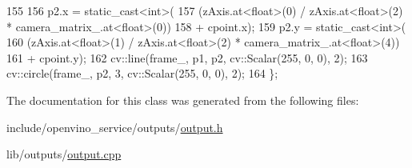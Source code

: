 \begin{DoxyCode}
155 
156   p2.x = \textcolor{keyword}{static\_cast<}\textcolor{keywordtype}{int}\textcolor{keyword}{>}(
157       (zAxis.at<\textcolor{keywordtype}{float}>(0) / zAxis.at<\textcolor{keywordtype}{float}>(2) * camera\_matrix\_.at<\textcolor{keywordtype}{float}>(0))
158           + cpoint.x);
159   p2.y = \textcolor{keyword}{static\_cast<}\textcolor{keywordtype}{int}\textcolor{keyword}{>}(
160       (zAxis.at<\textcolor{keywordtype}{float}>(1) / zAxis.at<\textcolor{keywordtype}{float}>(2) * camera\_matrix\_.at<\textcolor{keywordtype}{float}>(4))
161           + cpoint.y);
162   cv::line(frame\_, p1, p2, cv::Scalar(255, 0, 0), 2);
163   cv::circle(frame\_, p2, 3, cv::Scalar(255, 0, 0), 2);
164 \};
\end{DoxyCode}


The documentation for this class was generated from the following files\+:\begin{DoxyCompactItemize}
\item 
include/openvino\+\_\+service/outputs/\hyperlink{output_8h}{output.\+h}\item 
lib/outputs/\hyperlink{output_8cpp}{output.\+cpp}\end{DoxyCompactItemize}
